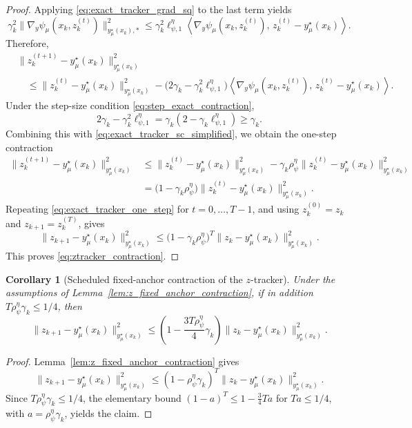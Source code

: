\documentclass{article}
\newtheorem{corollary}{Corollary}
\begin{document}
\begin{proof}
Applying \eqref{eq:exact_tracker_grad_sq} to the last term yields
\[
\gamma_k^2
\|\nabla_y\psi_\mu(x_k,z_k^{(t)})\|_{y_\mu^\star(x_k),*}^2
\le
\gamma_k^2\ell_{\psi,1}^\eta
\left\langle
\nabla_y\psi_\mu(x_k,z_k^{(t)}),
\,z_k^{(t)}-y_\mu^\star(x_k)
\right\rangle .
\]
Therefore,
\begin{align*}
&\|z_k^{(t+1)}-y_\mu^\star(x_k)\|_{y_\mu^\star(x_k)}^2 \\
&\quad\le
\|z_k^{(t)}-y_\mu^\star(x_k)\|_{y_\mu^\star(x_k)}^2
-
\bigl(2\gamma_k-\gamma_k^2\ell_{\psi,1}^\eta\bigr)
\left\langle
\nabla_y\psi_\mu(x_k,z_k^{(t)}),
\,z_k^{(t)}-y_\mu^\star(x_k)
\right\rangle .
\end{align*}
Under the step-size condition \eqref{eq:step_exact_contraction},
\[
2\gamma_k-\gamma_k^2\ell_{\psi,1}^\eta
=
\gamma_k(2-\gamma_k\ell_{\psi,1}^\eta)
\ge
\gamma_k .
\]
Combining this with \eqref{eq:exact_tracker_sc_simplified}, we obtain the one-step contraction
\begin{align}
\|z_k^{(t+1)}-y_\mu^\star(x_k)\|_{y_\mu^\star(x_k)}^2
&\le
\|z_k^{(t)}-y_\mu^\star(x_k)\|_{y_\mu^\star(x_k)}^2
-
\gamma_k\rho_\psi^\eta
\|z_k^{(t)}-y_\mu^\star(x_k)\|_{y_\mu^\star(x_k)}^2
\nonumber\\
&=
\bigl(1-\gamma_k\rho_\psi^\eta\bigr)
\|z_k^{(t)}-y_\mu^\star(x_k)\|_{y_\mu^\star(x_k)}^2 .
\label{eq:exact_tracker_one_step}
\end{align}
Repeating \eqref{eq:exact_tracker_one_step} for \(t=0,\ldots,T-1\), and using
\(z_k^{(0)}=z_k\) and \(z_{k+1}=z_k^{(T)}\), gives
\[
\|z_{k+1}-y_\mu^\star(x_k)\|_{y_\mu^\star(x_k)}^2
\le
\bigl(1-\gamma_k\rho_\psi^\eta\bigr)^T
\|z_k-y_\mu^\star(x_k)\|_{y_\mu^\star(x_k)}^2 .
\]
This proves \eqref{eq:ztracker_contraction}.
\end{proof}

\begin{corollary}[Scheduled fixed-anchor contraction of the \(z\)-tracker]
\label{cor:z_fixed_anchor_scheduled}
Under the assumptions of Lemma~\ref{lem:z_fixed_anchor_contraction}, if in addition
\(T\rho_\psi^\eta\gamma_k\le 1/4\), then
\[
\|z_{k+1}-y_\mu^\star(x_k)\|_{y_\mu^\star(x_k)}^2
\le
\left(1-\frac{3T\rho_\psi^\eta}{4}\gamma_k\right)
\|z_k-y_\mu^\star(x_k)\|_{y_\mu^\star(x_k)}^2 .
\]
\end{corollary}

\begin{proof}
Lemma~\ref{lem:z_fixed_anchor_contraction} gives
\[
\|z_{k+1}-y_\mu^\star(x_k)\|_{y_\mu^\star(x_k)}^2
\le
(1-\rho_\psi^\eta\gamma_k)^T
\|z_k-y_\mu^\star(x_k)\|_{y_\mu^\star(x_k)}^2 .
\]
Since \(T\rho_\psi^\eta\gamma_k\le 1/4\), the elementary bound
\((1-a)^T\le 1-\frac34Ta\) for \(Ta\le 1/4\), with \(a=\rho_\psi^\eta\gamma_k\), yields the claim.
\end{proof}
\end{document}
